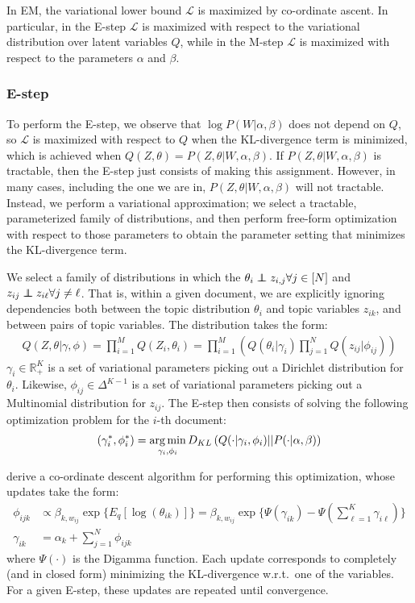 \documentclass[10pt]{article}
\begin{document}
In EM, the variational lower bound $\mathcal{L}$ is maximized by co-ordinate ascent. In particular, in the E-step $\mathcal{L}$ is maximized with respect to the variational distribution over latent variables $Q$, while in the M-step $\mathcal{L}$ is maximized with respect to the parameters $\alpha$ and $\beta$.

\subsubsection{E-step}
To perform the E-step, we observe that $\log P(W | \alpha, \beta)$ does not depend on $Q$, so $\mathcal{L}$ is maximized with respect to $Q$ when the KL-divergence term is minimized, which is achieved when $Q(Z, \theta) = P(Z, \theta | W, \alpha, \beta)$. If $P(Z, \theta | W, \alpha, \beta)$ is tractable, then the E-step just consists of making this assignment. However, in many cases, including the one we are in, $P(Z, \theta | W, \alpha, \beta)$ will not tractable. Instead, we perform a variational approximation; we select a tractable, parameterized family of distributions, and then perform free-form optimization with respect to those parameters to obtain the parameter setting that minimizes the KL-divergence term.

We select a family of distributions in which the $\theta_i \independent z_{i, j} \forall j \in [N]$ and $z_{ij} \independent z_{i\ell} \forall j \neq \ell$. That is, within a given document, we are explicitly ignoring dependencies both between the topic distribution $\theta_i$ and topic variables $z_{ik}$, and between pairs of topic variables. The distribution takes the form:
\begin{align}
    Q(Z, \theta | \gamma, \phi) = \prod_{i=1}^M Q(Z_i, \theta_i) = \prod_{i=1}^M \left(Q(\theta_i | \gamma_i)\prod_{j=1}^N Q(z_{ij} | \phi_{ij})\right)
\end{align}
$\gamma_i \in \mathbb{R}^K_+$ is a set of variational parameters picking out a Dirichlet distribution for $\theta_i$. Likewise, $\phi_{ij} \in \Delta^{K-1}$ is a set of variational parameters picking out a Multinomial distribution for $z_{ij}$. The E-step then consists of solving the following optimization problem for the $i$-th document:
\begin{align}
    (\gamma^*_i, \phi^*_i) = \operatorname*{arg\,min}_{\gamma_i, \phi_i} D_{KL}\left(Q(\cdot | \gamma_i, \phi_i) || P(\cdot | \alpha, \beta)\right)
\end{align}

\citet{blei2003latent} derive a co-ordinate descent algorithm for performing this optimization, whose updates take the form:
\begin{align}
    \phi_{ijk} &\propto \beta_{k, w_{ij}} \exp\{E_q[\log(\theta_{ik})]\} = \beta_{k, w_{ij}} \exp\{\Psi(\gamma_{ik}) - \Psi(\sum_{\ell = 1}^K \gamma_{i\ell})\}\\
    \gamma_{ik} &= \alpha_k + \sum_{j=1}^N \phi_{ijk}
\end{align}
where $\Psi(\cdot)$ is the Digamma function. Each update corresponds to completely (and in closed form) minimizing the KL-divergence w.r.t.\ one of the variables. For a given E-step, these updates are repeated until convergence.
\end{document}
